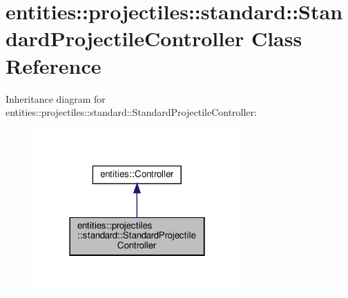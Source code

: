 \hypertarget{classentities_1_1projectiles_1_1standard_1_1StandardProjectileController}{}\section{entities\+:\+:projectiles\+:\+:standard\+:\+:Standard\+Projectile\+Controller Class Reference}
\label{classentities_1_1projectiles_1_1standard_1_1StandardProjectileController}


Inheritance diagram for entities\+:\+:projectiles\+:\+:standard\+:\+:Standard\+Projectile\+Controller\+:\nopagebreak
\begin{figure}[H]
\begin{center}
\leavevmode
\includegraphics[width=226pt]{classentities_1_1projectiles_1_1standard_1_1StandardProjectileController__inherit__graph}
\end{center}
\end{figure}


